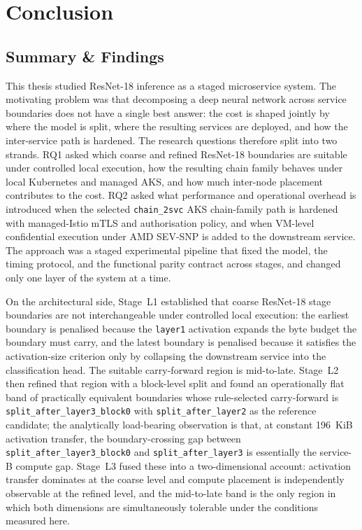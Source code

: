 \chapter{Conclusion}%
\label{ch:conclusion}

\section{Summary \& Findings}

This thesis studied ResNet-18 inference as a staged microservice
system. The motivating problem was that decomposing a deep neural
network across service boundaries does not have a single best answer:
the cost is shaped jointly by where the model is split, where the
resulting services are deployed, and how the inter-service path is
hardened. The research questions therefore split into two strands.
RQ1 asked which coarse and refined ResNet-18 boundaries are suitable 
under controlled local execution, how the resulting chain family
behaves under local Kubernetes and managed AKS, and how much
inter-node placement contributes to the cost. RQ2 asked what
performance and operational overhead is introduced when the selected
\texttt{chain\_2svc} AKS chain-family path is hardened with managed-Istio
mTLS and authorisation policy, and when VM-level confidential execution
under AMD SEV-SNP is added to the downstream service. The approach was a
staged experimental pipeline that fixed the model, the timing protocol,
and the functional parity contract across stages, and changed only one
layer of the system at a time.

On the architectural side, Stage~L1 established that coarse ResNet-18
stage boundaries are not interchangeable under controlled local
execution: the earliest boundary is penalised because the
\texttt{layer1} activation expands the byte budget the boundary must
carry, and the latest boundary is penalised because it satisfies the
activation-size criterion only by collapsing the downstream service
into the classification head. The suitable carry-forward region is
mid-to-late. Stage~L2 then refined that region with a block-level split
and found an operationally flat band of practically equivalent
boundaries whose rule-selected carry-forward is
\texttt{split\_after\_layer3\_block0} with
\texttt{split\_after\_layer2} as the reference candidate; the
analytically load-bearing observation is that, at constant 196~KiB
activation transfer, the boundary-crossing gap between
\texttt{split\_after\_layer3\_block0} and \texttt{split\_after\_layer3}
is essentially the service-B compute gap. Stage~L3 fused these into a
two-dimensional account: activation transfer dominates at the coarse
level and compute placement is independently observable at the
refined level, and the mid-to-late band is the only region in which
both dimensions are simultaneously tolerable under the conditions
measured here.

